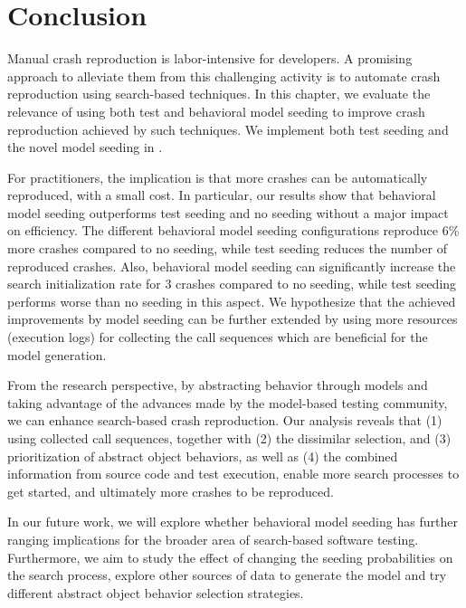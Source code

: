 

\section{Conclusion}
\label{sec:model_seeding:conclusion}

Manual crash reproduction is labor-intensive for developers.
A promising approach to alleviate them from this challenging activity is to automate crash reproduction using search-based techniques. In this chapter, we evaluate the relevance of using both test and behavioral model seeding to improve crash reproduction achieved by such techniques. We implement both test seeding and the novel model seeding in \botsing.

For practitioners, the implication is that more crashes can be automatically reproduced, with a small cost. In particular, our results show that behavioral model seeding outperforms test seeding and no seeding without a major impact on efficiency. The different behavioral model seeding configurations reproduce 6\% more crashes compared to no seeding, while test seeding reduces the number of reproduced crashes. Also, behavioral model seeding can significantly increase the search initialization rate for 3 crashes compared to no seeding, while test seeding performs worse than no seeding in this aspect. We hypothesize that the achieved improvements by model seeding can be further extended by using more resources (\ie execution logs) for collecting the call sequences which are beneficial for the model generation.

From the research perspective, by abstracting behavior through models and taking advantage of the advances made by the model-based testing community, we can enhance search-based crash reproduction.
Our analysis reveals that (1) using collected call sequences, together with (2) the dissimilar selection, and (3) prioritization of abstract object behaviors, as well as (4) the combined information from source code and test execution, enable more search processes to get started, and ultimately more crashes to be reproduced.

In our future work, we will explore whether behavioral model seeding has further ranging implications for the broader area of search-based software testing. Furthermore, we aim to study the effect of changing the seeding probabilities on the search process, explore other sources of data to generate the model and try different abstract object behavior selection strategies.

